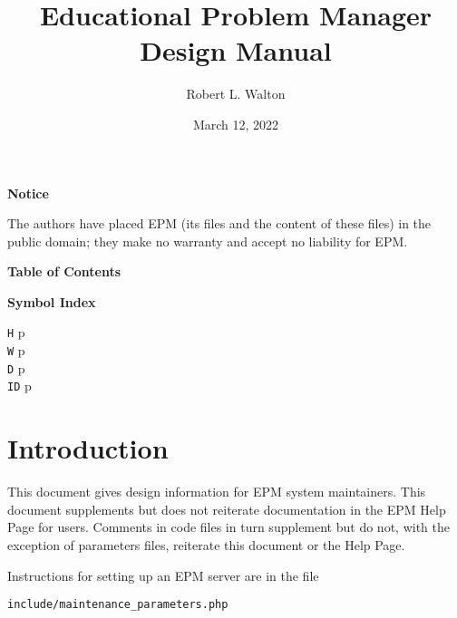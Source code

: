 \documentclass[12pt]{article}
\makeatletter
\renewcommand\tableofcontents{%
    \begin{list}{}%
	     {\setlength{\itemsep}{0in}%
	      \setlength{\topsep}{0in}%
	      \setlength{\parsep}{1ex}%
	      \setlength{\labelwidth}{0in}%
	      \setlength{\baselineskip}{1.5ex}%
	      \setlength{\leftmargin}{0.8in}%
	      \setlength{\rightmargin}{0.8in}}%
    \item\@starttoc{toc}%
    \end{list}}
\newcommand{\pagref}[1]{p\pageref{#1}}
\makeatother
\begin{document}
        
\title{Educational Problem Manager\\
Design Manual}

\author{Robert L. Walton}

\date{March 12, 2022}
 
\maketitle

\begin{center}
{\large \bf Notice}
\\[2ex]
\begin{minipage}{5.5in}
The authors have placed EPM (its files and the content of these files) in
the public domain; they make no warranty and accept
no liability for EPM.
\end{minipage}
\end{center}
\begin{center}
\large \bf Table of Contents
\end{center}

\bigskip

\tableofcontents 

\newpage

\begin{center}
{\bf Symbol Index}
\\[1ex]
\begin{minipage}{2in}
{\tt H} \dotfill \pagref{H-DIRECTORY} \\
{\tt W} \dotfill \pagref{W-DIRECTORY} \\
{\tt D} \dotfill \pagref{D-DIRECTORY} \\
{\tt ID} \dotfill \pagref{AIDS}
\end{minipage}
\end{center}


\newpage

\section{Introduction}

This document gives design information for EPM system maintainers.
This document supplements but does not reiterate
documentation in the EPM Help Page for
users.  Comments in code files in turn supplement but do not, with
the exception of parameters files,
reiterate this document or the Help Page.

Instructions for setting up an EPM server are in the file
\begin{center}
{\tt include/maintenance\_parameters.php}
\end{center}
\end{document}

